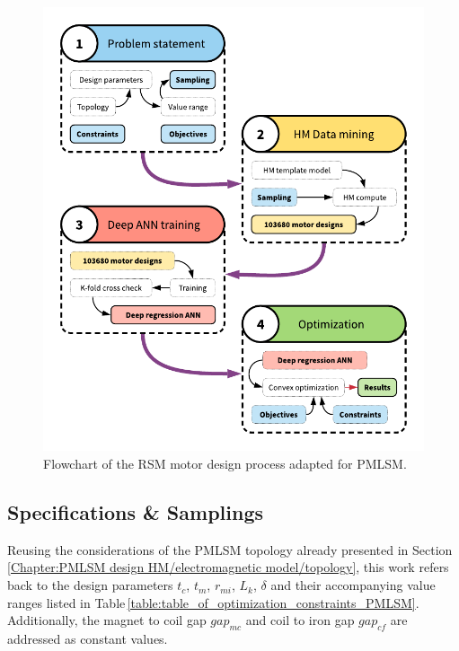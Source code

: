         
        \begin{figure}[h]
            \centering
            \includegraphics[width=4.5in]{chap4/images/optimization_process_RSM_for_PMLSM.pdf}
            \caption{Flowchart of the RSM motor design process adapted for PMLSM.}
            \label{fig:chapter/rsm/PMLSM optimization}
        \end{figure}
        
        
        \subsection{Specifications \& Samplings}    \label{Chapter:RSM/PMLSM/spec}
        
        
            Reusing the considerations of the \acs{PMLSM} topology already presented in Section\,\ref{Chapter:PMLSM design HM/electromagnetic model/topology}, this work refers back to the design parameters $t_c$, $t_m$, $r_{mi}$, $L_k$, $\delta$ and their accompanying value ranges listed in Table\,\ref{table:table_of_optimization_constraints_PMLSM}. Additionally, the magnet to coil gap $gap_{mc}$ and coil to iron gap $gap_{cf}$ are addressed as constant values. 
            
